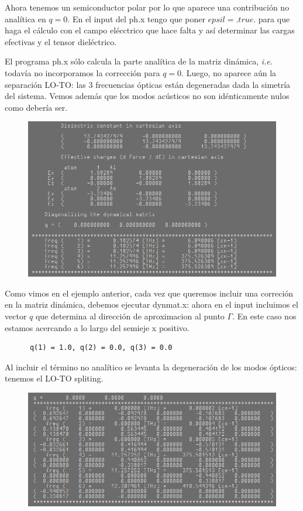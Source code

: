   Ahora tenemos un semiconductor polar por lo que aparece una contribución no analítica en $q=0$. En el input del ph.x tengo que poner $epsil = .true.$ para que haga el cálculo con el campo elécctrico que hace falta y así determinar las cargas efectivas y el tensor dieléctrico.

  El programa ph.x sólo calcula la parte analítica de la matriz dinámica, \emph{i.e.} todavía no incorporamos la corrección para $q=0$. Luego, no aparece aún la separación LO-TO: las 3 frecuencias ópticas están degeneradas dada la simetría del sistema. Vemos además que los modos acústicos no son idénticamente nulos como debería ser.

  \begin{figure}[H]
      \centering
      \includegraphics[scale = 0.6]{figs/D5/AlAs_pre.png}
  \end{figure}

  Como vimos en el ejemplo anterior, cada vez que queremos incluir una correción en la matriz dinámica, debemos ejecutar dynmat.x: ahora en el input incluimos el vector $q$ que determina al dirección  de aproximacion al punto $\Gamma$. En este caso nos estamos acercando a lo largo del semieje x positivo.
    \begin{verbatim}
      q(1) = 1.0, q(2) = 0.0, q(3) = 0.0
    \end{verbatim}

  Al incluir el término no analítico se levanta la degeneración de los modos ópticos: tenemos el LO-TO spliting.
    \begin{figure}[H]
        \centering
        \includegraphics[scale = 0.6]{figs/D5/AlAs_post.png}
    \end{figure}

